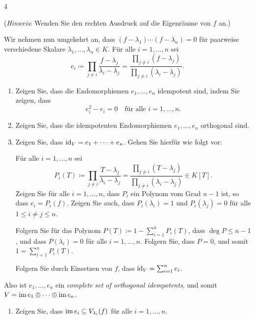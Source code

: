 \begin{question}[subtitle = Ein Kriterium für Diagonalisierbarkeit mithilfe von complete sets of orthogonal idempotents]{4}
\begin{enumerate}[resume]
      (\emph{Hinweis}:
       Wenden Sie den rechten Ausdruck auf die Eigenräume von $f$ an.)
  \end{enumerate}
  Wir nehmen nun umgekehrt an, dass $(f - \lambda_1) \dotsm (f - \lambda_n) = 0$ für paarweise verschiedene Skalare $\lambda_1, \dotsc, \lambda_n \in K$.
  Für alle $i = 1, \dotsc, n$ sei
  \[
              e_i
    \coloneqq \prod_{j \neq i} \frac{f - \lambda_j}{\lambda_i - \lambda_j}
    =         \frac{\prod_{j \neq i} (f-\lambda_j)}{\prod_{j \neq i} (\lambda_i - \lambda_j)}.
  \]
  \begin{enumerate}[resume]
    \item
      Zeigen Sie, dass die Endomorphismen $e_1, \dotsc, e_n$ idempotent sind, indem Sie zeigen, dass
      \[
        e_i^2 - e_i = 0
        \quad
        \text{für alle $i = 1, \dotsc, n$}.
      \]
    \item
      Zeigen Sie, dass die idempotenten Endomorphismen $e_1, \dotsc, e_n$ orthogonal sind.
    \item
      Zeigen Sie, dass $\operatorname{id}_V = e_1 + \dotsb + e_n$.
      Gehen Sie hierfür wie folgt vor:
      
      Für alle $i = 1, \dotsc, n$ sei
      \[
                  P_i(T)
        \coloneqq \prod_{j \neq i} \frac{T - \lambda_j}{\lambda_i - \lambda_j}
        =         \frac{\prod_{j \neq i} (T-\lambda_j)}{\prod_{j \neq i} (\lambda_i - \lambda_j)}
        \in K[T].
      \]
      Zeigen Sie für alle $i = 1, \dotsc, n$, dass $P_i$ ein Polynom vom Grad $n-1$ ist, so dass $e_i = P_i(f)$.
      Zeigen Sie auch, dass $P_i(\lambda_i) = 1$ und $P_i(\lambda_j) = 0$ für alle $1 \leq i \neq j \leq n$.
      
      Folgern Sie für das Polynom $P(T) \coloneqq 1 - \sum_{i=1}^n P_i(T)$, dass $\deg P \leq n-1$, und dass $P(\lambda_i) = 0$ für alle $i = 1, \dotsc, n$.
      Folgern Sie, dass $P = 0$, und somit $1 = \sum_{i=1}^n P_i(T)$.
      
      Folgern Sie durch Einsetzen von $f$, dass $\operatorname{id}_V = \sum_{i=1}^n e_i$.
  \end{enumerate}
  Also ist $e_1, \dotsc, e_n$ ein \emph{complete set of orthogonal idempotents}, und somit $V = \operatorname{im} e_1 \oplus \dotsb \oplus \operatorname{im} e_n$.
  \begin{enumerate}[resume]
    \item
      Zeigen Sie, dass $\operatorname{im} e_i \subseteq V_{\lambda_i}(f)$ für alle $i = 1, \dotsc, n$.
      

\end{enumerate}
\end{question}
